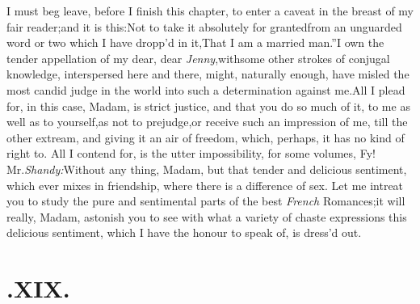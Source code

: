 \documentclass{article}
\begin{document}
I must beg leave, before I finish this chapter, to enter a
caveat in the breast of my fair reader;\tsk  and it is
this:\tsh\break  Not to take it absolutely for granted\break from an
unguarded word or two which I have dropp’d in
it,\tsh\lqq That I am a married
man.”\tsk  I own the tender appel\-lation of my dear, dear
\textit{Jenny},\tsk  with\break some other strokes of conjugal know\-ledge,
interspersed here and there, might, naturally enough, have misled
the most candid judge in the world into such a determination
against me.\tsk  All I plead for, in this case, Madam, is strict
justice, and that you do so much of it, to me as well as to
yourself,\tsk  as not to prejudge,\break or receive such an impression
of me, till
the other
extream, and giving it an air of freedom, which, perhaps, it has no
kind of right to. All I contend for, is the utter impossibility,
for some volumes, 
Fy! Mr.\@ \textit{Shandy:}\tsk  Without
any thing, Madam, but that tender and delicious\break
sentiment, which ever mixes in friend\-ship, where there is a difference of
sex.\break
Let me intreat you to study the pure and sentimental parts of the best
\textit{French}\break 
Romances;\tsh  it will really, Madam,\break
astonish you to see with what a variety of chaste expressions
this delicious sentiment, which I have the honour to speak of,
is dress’d out.

\section{.\enspace XIX.}
\end{document}
